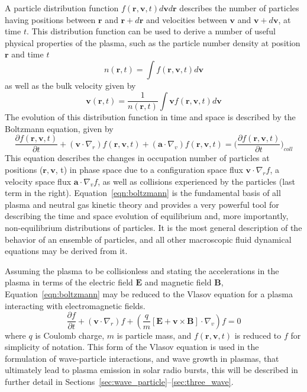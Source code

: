 A particle distribution function $f(\mathbf{r}, \mathbf{v}, t)d\mathbf{v}d\mathbf{r}$ describes the number of particles having positions between $\mathbf{r}$ and $\mathbf{r}+d\mathbf{r}$ and velocities between $\mathbf{v}$ and $\mathbf{v}+d\mathbf{v}$, at time $t$. This distribution function can be used to derive a number of useful physical properties of the plasma, such as the particle number density at position $\mathbf{r}$ and time $t$ 
\begin{equation}
n(\mathbf{r},t) = \int f(\mathbf{r}, \mathbf{v},t) d \mathbf{v}
\label{eqn:num_density}
\end{equation}
as well as the bulk velocity given by
\begin{equation}
 \mathbf{v}(\mathbf{r},t) = \frac{1}{n(\mathbf{r},t)}\int  \mathbf{v} f(\mathbf{r}, \mathbf{v},t) d \mathbf{v}
\label{eqn:bulk_flow}
\end{equation}
The evolution of this distribution function in time and space is described by the Boltzmann equation, given by
\begin{equation}
\frac{\partial f(\mathbf{r}, \mathbf{v},t)}{\partial t}  +     ( \mathbf{v}\cdot\nabla_r)f(\mathbf{r}, \mathbf{v},t)    + (\mathbf{a}\cdot\nabla_v)f(\mathbf{r}, \mathbf{v},t) = \bigg(\frac{\partial f(\mathbf{r}, \mathbf{v},t)}{\partial t}\bigg)_{coll}
\label{eqn:boltzmann}
\end{equation}
This equation describes the changes in occupation number of particles at positions ($\mathbf{r}, \mathbf{v}$, t) in phase space due to a configuration space flux $\mathbf{v}\cdot\nabla_rf$, a velocity space flux $ \mathbf{a}\cdot\nabla_vf$, as well as collisions experienced by the particles (last term in the right). Equation~\ref{eqn:boltzmann} is the fundamental basis of all plasma and neutral gas kinetic theory and provides a very powerful tool for describing the time and space evolution of equilibrium and, more importantly, non-equilibrium distributions of particles. It is the most general description of the behavior of an ensemble of particles, and all other macroscopic fluid dynamical equations may be derived from it.

Assuming  the plasma to be collisionless and stating the accelerations in the plasma in terms of the electric field $\mathbf{E}$ and magnetic field $\mathbf{B}$, Equation~\ref{eqn:boltzmann} may be reduced to the Vlasov equation for a plasma interacting with electromagnetic fields.
\begin{equation}
\frac{\partial f}{\partial t}  +(\mathbf{v}\cdot\nabla_r)f + (\frac{q}{m}[\mathbf{E} + \mathbf{v}\times \mathbf{B}]\cdot\nabla_v)f = 0
\end{equation}
where $q$ is Coulomb charge, $m$ is particle mass, and $f(\mathbf{r}, \mathbf{v},t)$ is reduced to $f$ for simplicity of notation. This form of the Vlasov equation is used in the formulation of wave-particle interactions, and wave growth in plasmas, that ultimately lead to plasma emission in solar radio bursts, this will be described in further detail  in Sections~\ref{sec:wave_particle}--\ref{sec:three_wave}.

